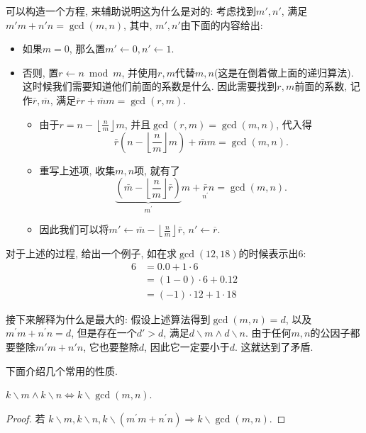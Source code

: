 \documentclass{ctexart}
\newcommand{\zc}{\backslash}
\begin{document}
可以构造一个方程, 来辅助说明这为什么是对的: 考虑找到$m', n'$, 满足$m'm+n'n=\gcd(m,n)$, 其中, $m', n'$由下面的内容给出: 
\begin{itemize}
    \item 如果$m=0$, 那么置$m' \leftarrow 0, n' \leftarrow 1$. 
    \item 否则, 置$r\leftarrow n \bmod m$, 并使用$r, m$代替$m, n$(这是在倒着做上面的递归算法). 这时候我们需要知道他们前面的系数是什么. 因此需要找到$r,m$前面的系数, 记作$\overline{r}, \overline{m}$, 满足$\overline{r}r+\overline{m}m=\gcd(r,m)$.
        \begin{itemize}
            \item 由于$r=n-\left\lfloor\frac{n}{m}\right\rfloor m$, 并且$\operatorname{gcd}(r, m)=\operatorname{gcd}(m, n)$, 代入得$$\bar{r}\left(n-\left\lfloor\frac{n}{m}\right\rfloor m\right)+\bar{m} m=\operatorname{gcd}(m, n).$$
            \item 重写上述项, 收集$m, n$项, 就有了$$\underbrace{\left(\bar{m}-\left\lfloor\frac{n}{m}\right\rfloor \bar{r}\right)}_{m^{\prime}} m+\underset{n^{\prime}}{\bar{r}} n=\operatorname{gcd}(m, n).$$
            \item 因此我们可以将$m' \leftarrow \bar{m}-\left\lfloor\frac{n}{m}\right\rfloor \bar{r}$, $n' \leftarrow \overline{r}$.
        \end{itemize}
\end{itemize}

对于上述的过程, 给出一个例子, 如在求$\gcd(12, 18)$的时候表示出6: 
\[
\begin{aligned}
6 & =0.0+1 \cdot 6 \\
& =(1-0) \cdot 6+0.12 \\
& =(-1) \cdot 12+1 \cdot 18
\end{aligned}
\]

接下来解释为什么是最大的: 假设上述算法得到$\gcd(m,n)=d$, 以及$m^{\prime} m+n^{\prime} n=d$, 但是存在一个$d'>d$, 满足$d\zc m \land d\zc n$. 
由于任何$m, n$的公因子都要整除$m'm+n'n$, 它也要整除$d$, 因此它一定要小于$d$. 这就达到了矛盾. 

下面介绍几个常用的性质. 

\begin{prop}
    $k \backslash m \wedge k \backslash n \Leftrightarrow k \backslash \operatorname{gcd}(m, n)$.
\end{prop}

\begin{proof}
    若 $k \backslash m, k \backslash n, k \backslash\left(m^{\prime} m+n^{\prime} n\right) \Rightarrow k \backslash \operatorname{gcd}(m, n)$.
\end{proof}
\end{document}

